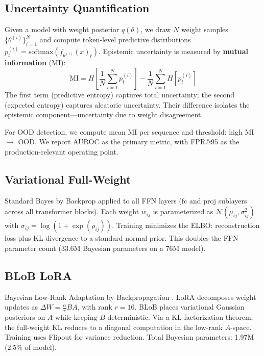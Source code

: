 \documentclass{article}
\begin{document}
\subsection{Uncertainty Quantification}

Given a model with weight posterior $q(\theta)$, we draw $N$ weight samples $\{\theta^{(i)}\}_{i=1}^N$ and compute token-level predictive distributions $p_t^{(i)} = \text{softmax}(f_{\theta^{(i)}}(x)_t)$. Epistemic uncertainty is measured by \textbf{mutual information} (MI):
\begin{equation}
\text{MI} = H\!\left[\frac{1}{N}\sum_{i=1}^{N} p_t^{(i)}\right] - \frac{1}{N}\sum_{i=1}^{N} H\!\left[p_t^{(i)}\right]
\label{eq:mi}
\end{equation}
The first term (predictive entropy) captures total uncertainty; the second (expected entropy) captures aleatoric uncertainty. Their difference isolates the epistemic component---uncertainty due to weight disagreement.

For OOD detection, we compute mean MI per sequence and threshold: high MI $\rightarrow$ OOD. We report AUROC as the primary metric, with FPR@95 as the production-relevant operating point.

\subsection{Variational Full-Weight}

Standard Bayes by Backprop applied to all FFN layers (fc and proj sublayers across all transformer blocks). Each weight $w_{ij}$ is parameterized as $\mathcal{N}(\mu_{ij}, \sigma_{ij}^2)$ with $\sigma_{ij} = \log(1 + \exp(\rho_{ij}))$. Training minimizes the ELBO: reconstruction loss plus KL divergence to a standard normal prior. This doubles the FFN parameter count (33.6M Bayesian parameters on a 76M model).

\subsection{BLoB LoRA}

Bayesian Low-Rank Adaptation by Backpropagation \citep{wang2024blob}. LoRA decomposes weight updates as $\Delta W = \frac{\alpha}{r} BA$, with rank $r{=}16$. BLoB places variational Gaussian posteriors on $A$ while keeping $B$ deterministic. Via a KL factorization theorem, the full-weight KL reduces to a diagonal computation in the low-rank $A$-space. Training uses Flipout for variance reduction. Total Bayesian parameters: 1.97M (2.5\% of model).
\end{document}

